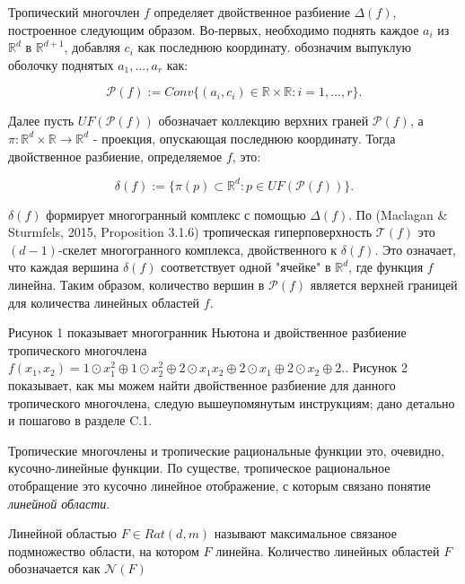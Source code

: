 \documentclass[russian]{lecture-notes}
\begin{document}
	Тропический многочлен $f$ определяет двойственное разбиение $\Delta(f)$, построенное следующим образом. Во-первых, необходимо поднять каждое $a_i$ из $\mathbb{R}^d$ в $\mathbb{R}^{d+1}$, добавляя $c_i$ как последнюю координату. обозначим выпуклую оболочку поднятых $a_1,...,a_r$ как:
	
	\begin{equation*}
	\mathcal{P}(f) := Conv\{(a_i, c_i) \in \mathbb{R} \times \mathbb{R} : i = 1,...,r\}.
	\end{equation*}
	
	Далее пусть $UF(\mathcal{P}(f))$ обозначает коллекцию верхних граней $\mathcal{P}(f)$, а $\pi : \mathbb{R}^d \times \mathbb{R} \to \mathbb{R}^d$ - проекция, опускающая последнюю координату. Тогда двойственное разбиение, определяемое $f$, это:
	
	\begin{equation*}
	\delta(f) := \{\pi (p) \subset \mathbb{R}^d : p \in UF(\mathcal{P}(f))\}.
	\end{equation*}
	
	$\delta(f)$ формирует многогранный комплекс с помощью $\Delta(f)$. По (Maclagan \& Sturmfels, 2015, Proposition 3.1.6) тропическая гиперповерхность $\mathcal{T}(f)$ это $(d-1)$-скелет многогранного комплекса, двойственного к $\delta(f)$. Это означает, что каждая вершина $\delta(f)$ соответствует одной "ячейке" в $\mathbb{R}^d$, где функция $f$ линейна. Таким образом, количество вершин в $\mathcal{P}(f)$ является верхней границей для количества линейных областей $f$.
	
	Рисунок 1 показывает многогранник Ньютона и двойственное разбиение тропического многочлена $f(x_1, x_2) = 1 \odot x_1^2 \oplus 1 \odot x_2^2 \oplus 2 \odot x_1x_2 \oplus 2 \odot x_1 \oplus 2 \odot x_2 \oplus 2.$. Рисунок 2 показывает, как мы можем найти двойственное разбиение для данного тропического многочлена, следую вышеупомянутым инструкциям; дано детально и пошагово в разделе C.1.
	
	Тропические многочлены и тропические рациональные функции это, очевидно, кусочно-линейные функции. По существе, тропическое рациональное отобращение это кусочно линейное отображение, с которым связано понятие \textit{линейной области}.
	
	\begin{Definition}
		Линейной областью $F \in Rat(d, m)$ называют максимальное связаное подмножество области, на котором $F$ линейна. Количество линейных областей $F$ обозначается как $\mathcal{N}(F)$
	\end{Definition}
	
\end{document}
